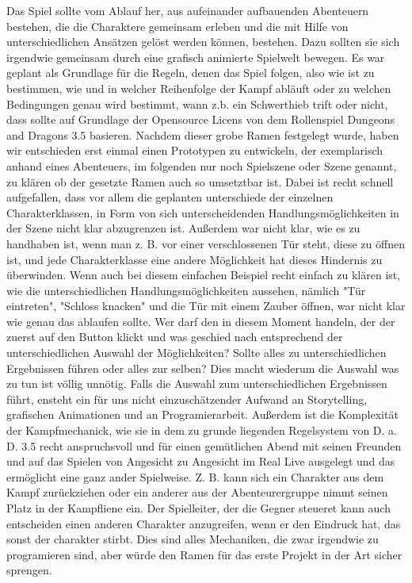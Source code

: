 Das Spiel sollte vom Ablauf her, aus aufeinander aufbauenden Abenteuern bestehen, die die Charaktere gemeinsam erleben und die mit Hilfe von unterschiedlichen Ansätzen gelöst werden können, bestehen. Dazu sollten sie sich irgendwie gemeinsam durch eine grafisch animierte Spielwelt bewegen.
Es war geplant als Grundlage für die Regeln, denen das Spiel folgen, also wie ist zu bestimmen, wie und in welcher Reihenfolge der Kampf abläuft oder zu welchen Bedingungen genau wird bestimmt, wann z.b. ein Schwerthieb trift oder nicht, dass sollte auf Grundlage der Opensource Licens von dem Rollenspiel Dungeons and Dragons 3.5 basieren.
Nachdem dieser grobe Ramen festgelegt wurde, haben wir entschieden erst einmal einen Prototypen zu entwickeln, der exemplarisch anhand eines Abenteuers, im folgenden nur noch Spielszene oder Szene genannt, zu klären ob der gesetzte Ramen auch so umsetztbar ist. 
Dabei ist recht schnell aufgefallen, dass vor allem die geplanten unterschiede der einzelnen Charakterklassen, in Form von sich unterscheidenden Handlungsmöglichkeiten in der Szene nicht klar abzugrenzen ist. Außerdem war nicht klar, wie es zu handhaben ist, wenn man z. B. vor einer verschlossenen Tür steht, diese zu öffnen ist, und jede Charakterklasse eine andere Möglichkeit hat dieses Hindernis zu überwinden. Wenn auch bei diesem einfachen Beispiel recht einfach zu klären ist, wie die unterschiedlichen Handlungsmöglichkeiten aussehen, nämlich "Tür eintreten", "Schloss knacken" und die Tür mit einem Zauber öffnen, war nicht klar wie genau das ablaufen sollte. Wer darf den in diesem Moment handeln, der der zuerst auf den Button klickt und was geschied nach entsprechend der unterschiedlichen Auswahl der Möglichkeiten? Sollte alles zu unterschiedlichen Ergebnissen führen oder alles zur selben? Dies macht wiederum die Auswahl was zu tun ist völlig unnötig. Falls die Auswahl zum unterschiedlichen Ergebnissen führt, ensteht ein für uns nicht einzuschätzender Aufwand an Storytelling, grafischen Animationen und an Programierarbeit. Außerdem ist die Komplexität der Kampfmechanick, wie sie in dem zu grunde liegenden Regelsystem von D. a. D. 3.5 recht anspruchsvoll und für einen gemütlichen Abend mit seinen Freunden und auf das Spielen von Angesicht zu Angesicht im Real Live ausgelegt und das ermöglicht eine ganz ander Spielweise. Z. B. kann sich ein Charakter aus dem Kampf zurückziehen oder ein anderer aus der Abenteurergruppe nimmt seinen Platz in der Kampfliene ein. Der Spielleiter, der die Gegner steueret kann auch entscheiden einen anderen Charakter anzugreifen, wenn er den Eindruck hat, das sonst der charakter stirbt. Dies sind alles Mechaniken, die zwar irgendwie zu programieren sind, aber würde den Ramen für das erste Projekt in der Art sicher sprengen.
